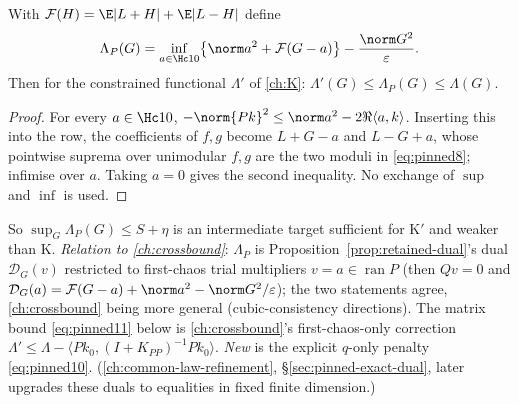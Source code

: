 \begin{proposition}\label{prop:LambdaP}
With $\mathcal F(H)=\E|L+H|+\E|L-H|$ define
\begin{equation}\label{eq:pinned8}
\Lambda_P(G)=\inf_{a\in\Hc10}\bigl\{\norm a^2+\mathcal F(G-a)\bigr\}-\frac{\norm G^2}\varepsilon .
\end{equation}
Then for the constrained functional $\Lambda'$ of \autoref{ch:K}: $\Lambda'(G)\le\Lambda_P(G)\le\Lambda(G)$.
\end{proposition}
\begin{proof}For every $a\in\Hc10$, $-\norm{Pk}^2\le\norm a^2-2\Re\langle a,k\rangle$. Inserting this into the row, the coefficients of $f,g$ become $L+G-a$ and $L-G+a$, whose pointwise suprema over
unimodular $f,g$ are the two moduli in \eqref{eq:pinned8}; infimise over $a$. Taking $a=0$ gives the second inequality. No exchange of $\sup$ and $\inf$ is used.\end{proof}
So $\sup_G\Lambda_P(G)\le S+\eta$ is an intermediate target sufficient for K$'$ and weaker than K. \emph{Relation to \autoref{ch:crossbound}}: $\Lambda_P$ is Proposition~\ref{prop:retained-dual}'s
dual $\mathcal D_G(v)$ restricted to first-chaos trial multipliers $v=a\in\operatorname{ran}P$ (then $Qv=0$ and $\mathcal D_G(a)=\mathcal F(G-a)+\norm a^2-\norm G^2/\varepsilon$); the two statements agree,
\autoref{ch:crossbound} being more general (cubic-consistency directions). The matrix bound \eqref{eq:pinned11} below is \autoref{ch:crossbound}'s first-chaos-only correction
$\Lambda'\le\Lambda-\langle Pk_0,(I+K_{PP})^{-1}Pk_0\rangle$. \emph{New} is the explicit $q$-only penalty \eqref{eq:pinned10}. (\autoref{ch:common-law-refinement}, \S\ref{sec:pinned-exact-dual}, later upgrades these duals to equalities in fixed finite dimension.)


